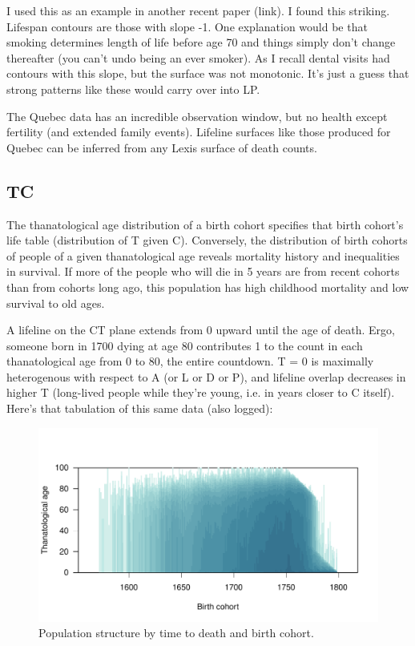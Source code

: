 I used this as an example in another recent paper (link). I found this striking.
 Lifespan contours are those with slope -1. One explanation would be that smoking determines length of life before age 70 and things simply don't change thereafter (you can't undo being an ever smoker). As I recall dental visits had contours with this slope, but the surface was not monotonic. It's just a guess that strong patterns like these would carry over into LP.

The Quebec data has an incredible observation window, but no health except fertility (and extended family events). Lifeline surfaces like those produced for Quebec can be inferred from any Lexis surface of death counts.

\subsection{TC}

The thanatological age distribution of a birth cohort specifies that birth
cohort's life table (distribution of T given C). Conversely, the distribution of
birth cohorts of people of a given thanatological age reveals mortality history and inequalities in
survival. If more of the people who will die in 5 years are from recent cohorts
than from cohorts long ago, this population has high childhood mortality and low survival to old ages.

A lifeline on the CT plane extends from 0 upward until the age of death. Ergo,
someone born in 1700 dying at age 80 contributes 1 to the count in each thanatological age from 0 to 80, the entire countdown. T = 0 is maximally heterogenous with respect to A (or L or D or P), and lifeline overlap decreases in higher T (long-lived people while they're young, i.e. in years closer to C itself). Here's that tabulation of this same data (also logged):

\begin{figure}
\includegraphics[scale=.9]{Figures/QuebecTC.pdf}
\caption{Population structure by time to death and birth cohort.}
\label{fig:tcq}
\end{figure}

